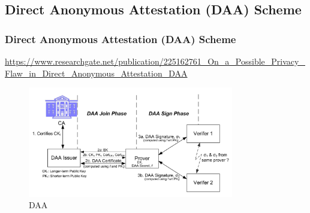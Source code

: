 \documentclass{ctexbeamer}
\begin{document}
\subsection{Direct Anonymous Attestation (DAA) Scheme}
\begin{frame}
\frametitle{Direct Anonymous Attestation (DAA) Scheme}

    \url{https://www.researchgate.net/publication/225162761_On_a_Possible_Privacy_Flaw_in_Direct_Anonymous_Attestation_DAA}

    \begin{figure}[H]
        \centering 
        \includegraphics[width=0.8\textwidth]{pic/daa.png} 
        \caption{DAA} 
        \label{fig.daa}
    \end{figure}
\end{frame}
\end{document}
